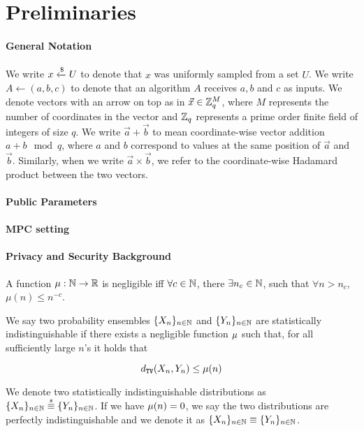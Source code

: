 \section{Preliminaries}
\label{sec:prelims}

\paragraph{General Notation}

We write $x \xleftarrow{\$} U$ to denote that $x$ was uniformly sampled from a set $U$. We write $A \gets (a,b,c)$ to denote that an algorithm $A$ receives $a,b$ and $c$ as inputs.
We denote vectors with an arrow on top as in $\vec{x} \in \mathbb{Z}_q^M$, where $M$ represents the number of coordinates
in the vector and $\mathbb{Z}_q$ represents a prime order finite field of integers of size $q$. 
We write $\vec{a} + \vec{b}$ to mean coordinate-wise vector addition $a + b \mod q$, where $a$ and $b$ correspond to values at the same position of $\vec{a}$ and
$\vec{b}$.  
Similarly, when we write $\vec{a} \times \vec{b}$, we refer to the coordinate-wise Hadamard product between the two vectors.

\paragraph{Public Parameters}

\paragraph{MPC setting}

\paragraph{Privacy and Security Background}
\label{sec:background}

\begin{definition}
A function $\mu: \mathbb{N} \rightarrow \mathbb{R}$	is negligible iff $\forall c \in \mathbb{N}$, there $\exists n_c \in \mathbb{N}$, such that $\forall n > n_c$, $\mu(n) \leq n^{-c}$.
\end{definition}

\begin{definition} We say two probability ensembles $\{ X_n\}_{n \in \mathbb{N} }$ and  $\{ Y_n\}_{n \in \mathbb{N}}$ are statistically indistinguishable if there exists a negligible function $\mu$ such that, for all sufficiently large $n$'s it holds that 

\begin{equation*}
	 d_\mathtt{TV} (X_n, Y_n) \leq \mu(n)
\end{equation*} 

We denote two statistically indistinguishable distributions as $\{ X_n\}_{n \in \mathbb{N}} \stackrel{s}{\equiv} \{
  Y_n\}_{n \in \mathbb{N}}$. If we have $\mu(n) = 0$, we say the two distributions are perfectly indistinguishable and we denote it as $\{ X_n\}_{n \in \mathbb{N}} \equiv \{
  Y_n\}_{n \in \mathbb{N}}$.
	
\end{definition}

